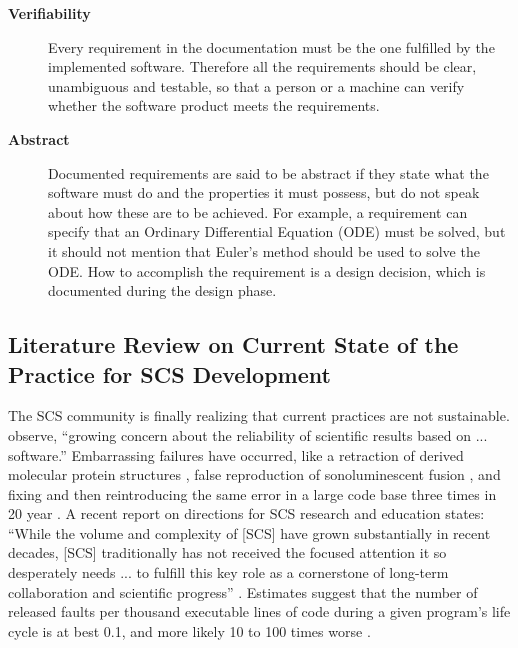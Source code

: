 \documentclass[12pt]{article}
\begin{document}
\begin{description}
\item [\textbf{Verifiability}] Every requirement in the documentation must be the
  one fulfilled by the implemented software. Therefore all the requirements
  should be clear, unambiguous and testable, so that a person or a machine can
  verify whether the software product meets the requirements.

\item [\textbf{Abstract}] Documented requirements are said to be abstract if they
  state what the software must do and the properties it must possess, but do not
  speak about how these are to be achieved. For example, a requirement can
  specify that an Ordinary Differential Equation (ODE) must be solved, but it
  should not mention that Euler's method should be used to solve the ODE. How to
  accomplish the requirement is a design decision, which is documented during
  the design phase.

\end{description}

\subsection{Literature Review on Current State of the Practice for SCS
  Development} \label{SecCurrStateOfThePractice}

The SCS community is finally realizing that current practices are not
sustainable.  \citet{FaulkEtAl2009} observe, ``growing concern about the
reliability of scientific results based on ... software.''  Embarrassing
failures have occurred, like a retraction of derived molecular protein
structures \citep{Miller2006}, false reproduction of sonoluminescent fusion
\citep{PostAndVotta2005}, and fixing and then reintroducing the same error in a
large code base three times in 20 year \citep{MilewiczAndRaybourn2018}.  A
recent report on directions for SCS research and education states: ``While the
volume and complexity of [SCS] have grown substantially in recent decades, [SCS]
traditionally has not received the focused attention it so desperately needs
... to fulfill this key role as a cornerstone of long-term collaboration and
scientific progress'' \citep{RudeEtAl2018}.  Estimates suggest that the number
of released faults per thousand executable lines of code during a given
program’s life cycle is at best 0.1, and more likely 10 to 100 times worse
\citep{Hatton2007}.
\end{document}
